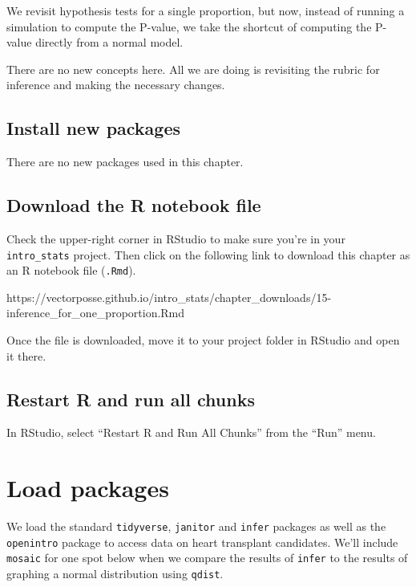 \documentclass[
]{book}
\begin{document}
We revisit hypothesis tests for a single proportion, but now, instead of running a simulation to compute the P-value, we take the shortcut of computing the P-value directly from a normal model.

There are no new concepts here. All we are doing is revisiting the rubric for inference and making the necessary changes.

\hypertarget{one-prop-install}{%
\subsection{Install new packages}\label{one-prop-install}}

There are no new packages used in this chapter.

\hypertarget{one-prop-download}{%
\subsection{Download the R notebook file}\label{one-prop-download}}

Check the upper-right corner in RStudio to make sure you're in your \texttt{intro\_stats} project. Then click on the following link to download this chapter as an R notebook file (\texttt{.Rmd}).

https://vectorposse.github.io/intro\_stats/chapter\_downloads/15-inference\_for\_one\_proportion.Rmd

Once the file is downloaded, move it to your project folder in RStudio and open it there.

\hypertarget{one-prop-restart}{%
\subsection{Restart R and run all chunks}\label{one-prop-restart}}

In RStudio, select ``Restart R and Run All Chunks'' from the ``Run'' menu.

\hypertarget{one-prop-load}{%
\section{Load packages}\label{one-prop-load}}

We load the standard \texttt{tidyverse}, \texttt{janitor} and \texttt{infer} packages as well as the \texttt{openintro} package to access data on heart transplant candidates. We'll include \texttt{mosaic} for one spot below when we compare the results of \texttt{infer} to the results of graphing a normal distribution using \texttt{qdist}.
\end{document}
